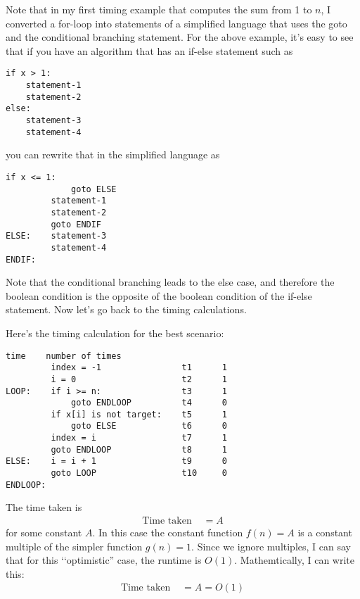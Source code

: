 Note that in my first timing example that computes the sum from 1 to $n$,
I converted a for-loop into statements of a simplified
language that uses the goto and the
conditional branching statement.
For the above example, it's easy to see that if you have an algorithm
that has an if-else statement such as
\begin{Verbatim}[frame=single, fontsize=\footnotesize]
if x > 1:
    statement-1
    statement-2
else:
    statement-3    
    statement-4
\end{Verbatim}
you can rewrite that in the simplified language as
\begin{Verbatim}[frame=single, fontsize=\footnotesize]
         if x <= 1:
             goto ELSE
         statement-1
         statement-2
         goto ENDIF
ELSE:    statement-3
         statement-4
ENDIF:         
\end{Verbatim}
Note that the conditional branching leads to the else case, and therefore
the boolean condition is the opposite of the boolean condition of the
if-else statement.
Now let's go back to the timing calculations.

Here's the timing calculation for the best scenario:
\begin{Verbatim}[frame=single, fontsize=\footnotesize]
                                   time    number of times   
         index = -1                t1      1
         i = 0                     t2      1
LOOP:    if i >= n:                t3      1
             goto ENDLOOP          t4      0
         if x[i] is not target:    t5      1
             goto ELSE             t6      0
         index = i                 t7      1
         goto ENDLOOP              t8      1
ELSE:    i = i + 1                 t9      0
         goto LOOP                 t10     0
ENDLOOP:
\end{Verbatim}
The time taken is
\begin{align*}
\text{Time taken } 
&= A
\end{align*}
for some constant $A$.
In this case the constant function $f(n) = A$
is a constant multiple of the simpler function $g(n) = 1$.
Since we ignore multiples, I can say that for this 
\lq\lq optimistic'' case, the runtime is $O(1)$.
Mathemtically, I can write this:
\begin{align*}
\text{Time taken } 
&= A = O(1)
\end{align*}

